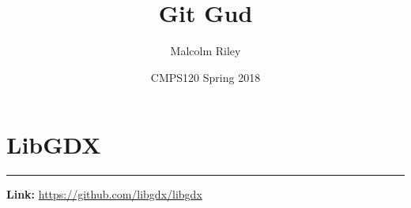\documentclass[12pt]{article}
\title{\textbf{Git Gud}}
\author{Malcolm Riley}
\date{CMPS120 Spring 2018}
\begin{document}
\maketitle

\section*{LibGDX}


\vspace{3mm} \hrule \vspace{3mm}
\textbf{Link:} \url{https://github.com/libgdx/libgdx}
\end{document}
